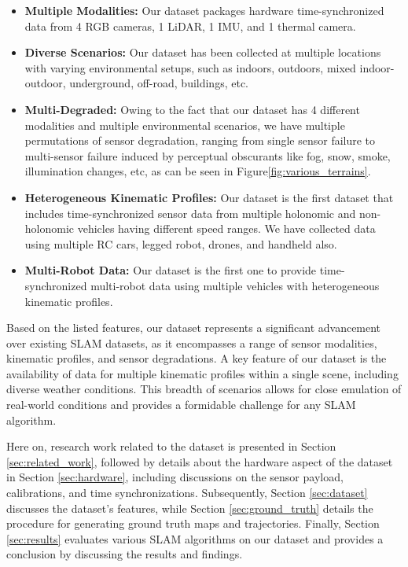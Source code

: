 \documentclass[10pt,twocolumn,letterpaper]{article}
\begin{document}
\begin{itemize}[noitemsep,topsep=0pt]

    \item \textbf{Multiple Modalities:} Our dataset packages hardware time-synchronized data from 4 RGB cameras, 1 LiDAR, 1 IMU, and 1 thermal camera. 
    \item \textbf{Diverse Scenarios:} Our dataset has been collected at multiple locations with varying environmental setups, such as indoors, outdoors, mixed indoor-outdoor, underground, off-road, buildings, etc.
    \item\textbf{Multi-Degraded:} Owing to the fact that our dataset has 4 different modalities and multiple environmental scenarios, we have multiple permutations of sensor degradation, ranging from single sensor failure to multi-sensor failure induced by perceptual obscurants like fog, snow, smoke, illumination changes, etc, as can be seen in Figure\ref{fig:various_terrains}.
    \item \textbf{Heterogeneous Kinematic Profiles:} Our dataset is the first dataset that includes time-synchronized sensor data from multiple holonomic and non-holonomic vehicles having different speed ranges. We have collected data using multiple RC cars, legged robot, drones, and handheld also.
    \item\textbf{Multi-Robot Data:} Our dataset is the first one to provide time-synchronized multi-robot data using multiple vehicles with heterogeneous kinematic profiles.
    

\end{itemize}

Based on the listed features, our dataset represents a significant advancement over existing SLAM datasets, as it encompasses a range of sensor modalities, kinematic profiles, and sensor degradations. A key feature of our dataset is the availability of data for multiple kinematic profiles within a single scene, including diverse weather conditions. This breadth of scenarios allows for close emulation of real-world conditions and provides a formidable challenge for any SLAM algorithm.

Here on, research work related to the dataset is presented in Section \ref{sec:related_work}, followed by details about the hardware aspect of the dataset in Section \ref{sec:hardware}, including discussions on the sensor payload, calibrations, and time synchronizations. Subsequently, Section \ref{sec:dataset} discusses the dataset's features, while Section \ref{sec:ground_truth} details the procedure for generating ground truth maps and trajectories. Finally, Section \ref{sec:results} evaluates various SLAM algorithms on our dataset and provides a conclusion by discussing the results and findings.
\end{document}
